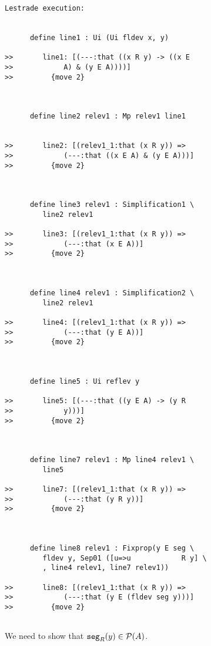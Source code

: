 \documentclass{article}
\begin{document}
\begin{verbatim}Lestrade execution:


      define line1 : Ui (Ui fldev x, y)

>>       line1: [(---:that ((x R y) -> ((x E
>>            A) & (y E A))))]
>>         {move 2}



      define line2 relev1 : Mp relev1 line1


>>       line2: [(relev1_1:that (x R y)) =>
>>            (---:that ((x E A) & (y E A)))]
>>         {move 2}



      define line3 relev1 : Simplification1 \
         line2 relev1

>>       line3: [(relev1_1:that (x R y)) =>
>>            (---:that (x E A))]
>>         {move 2}



      define line4 relev1 : Simplification2 \
         line2 relev1

>>       line4: [(relev1_1:that (x R y)) =>
>>            (---:that (y E A))]
>>         {move 2}



      define line5 : Ui reflev y

>>       line5: [(---:that ((y E A) -> (y R
>>            y)))]
>>         {move 2}



      define line7 relev1 : Mp line4 relev1 \
         line5

>>       line7: [(relev1_1:that (x R y)) =>
>>            (---:that (y R y))]
>>         {move 2}



      define line8 relev1 : Fixprop(y E seg \
         fldev y, Sep01 ([u=>u            R y] \
         , line4 relev1, line7 relev1))

>>       line8: [(relev1_1:that (x R y)) =>
>>            (---:that (y E (fldev seg y)))]
>>         {move 2}


\end{verbatim}

We need to show that ${\tt seg}_R(y) \in {\cal P}(A)$.
\end{document}
